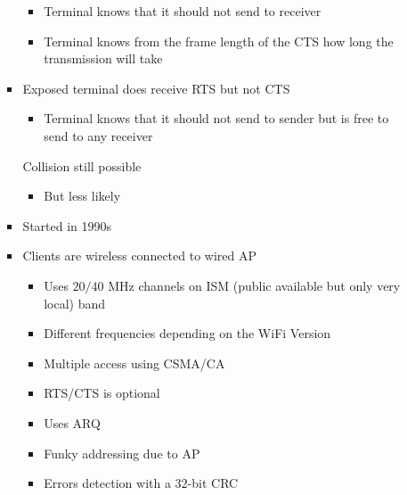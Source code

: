 \begin{itemize}
\begin{itemize}
\begin{itemize}
                        \begin{itemize}
                            \item Terminal knows that it should not send to receiver
                            \item Terminal knows from the frame length of the CTS how long the transmission will take
                        \end{itemize}
                    \item Exposed terminal does receive RTS but not CTS
                        \begin{itemize}
                            \item Terminal knows that it should not send to sender but is free to send to any receiver
                        \end{itemize}
                    \icon Collision still possible
                        \begin{itemize}
                            \item But less likely
                        \end{itemize}
                \end{itemize}
                \begin{itemize}
                    \item Started in 1990s
                    \item Clients are wireless connected to wired AP
                        \begin{itemize}
                            \item Uses $20/40$ MHz channels on ISM (public available but only very local) band
                            \item Different frequencies depending on the WiFi Version
                        \end{itemize}
                        \begin{itemize}
                            \item Multiple access using CSMA/CA
                            \item RTS/CTS is optional
                            \item Uses ARQ
                            \item Funky addressing due to AP 
                            \item Errors detection with a $32$-bit CRC

\end{itemize}
\end{itemize}
\end{itemize}
\end{itemize}
